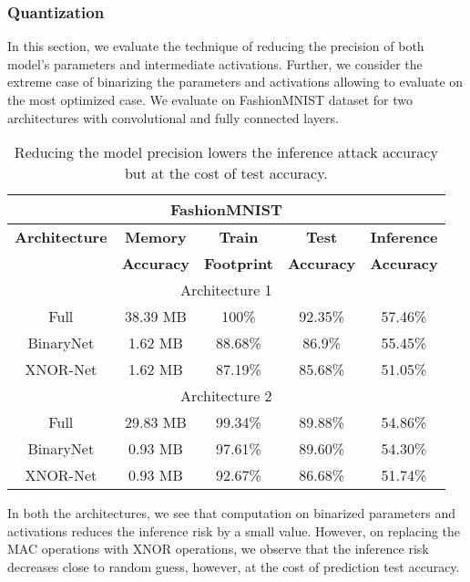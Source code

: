 \subsubsection{Quantization}

In this section, we evaluate the technique of reducing the precision of both model's parameters and intermediate activations.
Further, we consider the extreme case of binarizing the parameters and activations allowing to evaluate on the most optimized case.
We evaluate on FashionMNIST dataset for two architectures with convolutional and fully connected layers.

\begin{table}[!htb]
\begin{center}
\renewcommand\arraystretch{1.5}
\fontsize{6.7pt}{6.7pt}\selectfont
\begin{tabular}{|c|c|c|c|c|}
\hline
\multicolumn{5}{|c|}{\textbf{FashionMNIST}}\\
\hline
\textbf{Architecture} & \textbf{Memory} & \textbf{Train}  & \textbf{Test}  & \textbf{Inference}  \\
 & \textbf{Accuracy} &  \textbf{Footprint} & \textbf{Accuracy} & \textbf{Accuracy}  \\
\hline
\multicolumn{5}{|c|}{Architecture 1}\\
Full & 38.39 MB & 100\% & 92.35\% & \cellcolor{red!25}57.46\%\\
BinaryNet & 1.62 MB & 88.68\% & 86.9\% & \cellcolor{green!25}55.45\%\\
XNOR-Net & 1.62 MB & 87.19\% & 85.68\% & \cellcolor{green!25}51.05\%\\ %
\hline
\multicolumn{5}{|c|}{Architecture 2}\\
Full & 29.83 MB & 99.34\% & 89.88\% & \cellcolor{red!25}54.86\% \\
BinaryNet & 0.93 MB & 97.61\% & 89.60\% & \cellcolor{green!25}54.30\%\\
XNOR-Net & 0.93 MB & 92.67\% & 86.68\% & \cellcolor{green!25}51.74\%\\ %
\hline
\end{tabular}
\end{center}
\caption{Reducing the model precision lowers the inference attack accuracy but at the cost of test accuracy.}
\label{fmnist_quantize}
\end{table}

In both the architectures, we see that computation on  binarized parameters and activations reduces the inference risk by a small value.
However, on replacing the MAC operations with XNOR operations, we observe that the inference risk decreases close to random guess, however, at the cost of prediction test accuracy.

